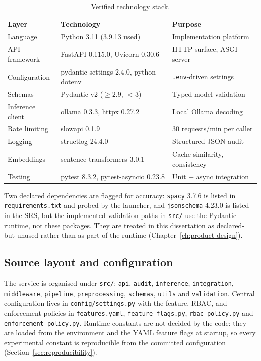 \begin{table}[h]
\centering
\small
\caption{Verified technology stack.}\label{tab:stack}
\begin{tabular}{@{}lll@{}}
\toprule
\textbf{Layer} & \textbf{Technology} & \textbf{Purpose}\\
\midrule
Language & Python 3.11 (3.9.13 used) & Implementation platform\\
API framework & FastAPI 0.115.0, Uvicorn 0.30.6 & HTTP surface, ASGI server\\
Configuration & pydantic-settings 2.4.0, python-dotenv & \texttt{.env}-driven settings\\
Schemas & Pydantic v2 ($\ge 2.9$, $<3$) & Typed model validation\\
Inference client & ollama 0.3.3, httpx 0.27.2 & Local Ollama decoding\\
Rate limiting & slowapi 0.1.9 & 30 requests/min per caller\\
Logging & structlog 24.4.0 & Structured JSON audit\\
Embeddings & sentence-transformers 3.0.1 & Cache similarity, consistency\\
Testing & pytest 8.3.2, pytest-asyncio 0.23.8 & Unit + async integration\\
\bottomrule
\end{tabular}
\end{table}

Two declared dependencies are flagged for accuracy: \texttt{spacy} 3.7.6 is
listed in \texttt{requirements.txt} and probed by the launcher, and
\texttt{jsonschema} 4.23.0 is listed in the SRS, but the implemented validation
paths in \texttt{src/} use the Pydantic runtime, not these packages. They are
treated in this dissertation as declared-but-unused rather than as part of the
runtime (Chapter~\ref{ch:product-design}).

\subsection*{Source layout and configuration}

\begin{sloppypar}
The service is organised under
\texttt{src/}: \texttt{api}, \texttt{audit}, \texttt{inference},
\texttt{integration}, \texttt{middleware}, \texttt{pipeline},
\texttt{preprocessing}, \texttt{schemas}, \texttt{utils} and
\texttt{validation}. Central configuration lives in \texttt{config/}\hspace{0pt}\texttt{settings.py}
with the feature, RBAC, and enforcement policies in \texttt{features.yaml},
\texttt{feature\_}\hspace{0pt}\texttt{flags.py}, \texttt{rbac\_}\hspace{0pt}\texttt{policy.py} and
\texttt{enforcement\_}\hspace{0pt}\texttt{policy.py}. Runtime constants are not decided by the
code: they are loaded from the environment and the YAML feature flags at
startup, so every experimental constant is reproducible from the committed
configuration (Section~\ref{sec:reproducibility}).
\end{sloppypar}


